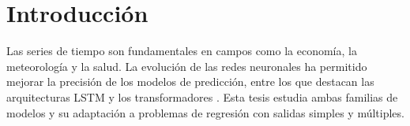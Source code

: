 \chapter{Introducción}

Las series de tiempo son fundamentales en campos como la economía, la meteorología y la salud. La evolución de las redes neuronales ha permitido mejorar la precisión de los modelos de predicción, entre los que destacan las arquitecturas LSTM \cite{hochreiter1997lstm} y los transformadores \cite{vaswani2017attention}. Esta tesis estudia ambas familias de modelos y su adaptación a problemas de regresión con salidas simples y múltiples.






